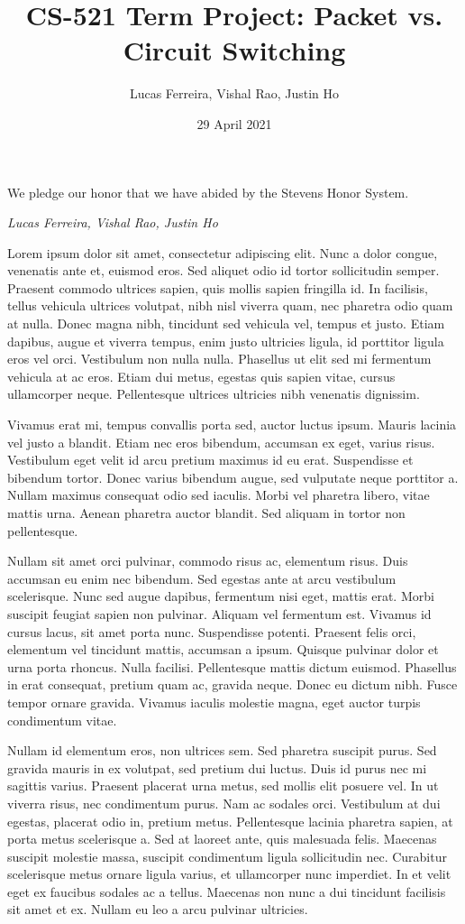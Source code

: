 \documentclass{article}
\title{CS-521 Term Project: Packet vs. Circuit Switching}
\author{Lucas Ferreira, Vishal Rao, Justin Ho}
\date{29 April 2021}
\begin{document}
  \maketitle

  {\flushleft We pledge our honor that we have abided by the Stevens Honor System.

  \textit{Lucas Ferreira, Vishal Rao, Justin Ho}}

  

Lorem ipsum dolor sit amet, consectetur adipiscing elit. Nunc a dolor congue, venenatis ante et, euismod eros. Sed aliquet odio id tortor sollicitudin semper. Praesent commodo ultrices sapien, quis mollis sapien fringilla id. In facilisis, tellus vehicula ultrices volutpat, nibh nisl viverra quam, nec pharetra odio quam at nulla. Donec magna nibh, tincidunt sed vehicula vel, tempus et justo. Etiam dapibus, augue et viverra tempus, enim justo ultricies ligula, id porttitor ligula eros vel orci. Vestibulum non nulla nulla. Phasellus ut elit sed mi fermentum vehicula at ac eros. Etiam dui metus, egestas quis sapien vitae, cursus ullamcorper neque. Pellentesque ultrices ultricies nibh venenatis dignissim.

Vivamus erat mi, tempus convallis porta sed, auctor luctus ipsum. Mauris lacinia vel justo a blandit. Etiam nec eros bibendum, accumsan ex eget, varius risus. Vestibulum eget velit id arcu pretium maximus id eu erat. Suspendisse et bibendum tortor. Donec varius bibendum augue, sed vulputate neque porttitor a. Nullam maximus consequat odio sed iaculis. Morbi vel pharetra libero, vitae mattis urna. Aenean pharetra auctor blandit. Sed aliquam in tortor non pellentesque.

Nullam sit amet orci pulvinar, commodo risus ac, elementum risus. Duis accumsan eu enim nec bibendum. Sed egestas ante at arcu vestibulum scelerisque. Nunc sed augue dapibus, fermentum nisi eget, mattis erat. Morbi suscipit feugiat sapien non pulvinar. Aliquam vel fermentum est. Vivamus id cursus lacus, sit amet porta nunc. Suspendisse potenti. Praesent felis orci, elementum vel tincidunt mattis, accumsan a ipsum. Quisque pulvinar dolor et urna porta rhoncus. Nulla facilisi. Pellentesque mattis dictum euismod. Phasellus in erat consequat, pretium quam ac, gravida neque. Donec eu dictum nibh. Fusce tempor ornare gravida. Vivamus iaculis molestie magna, eget auctor turpis condimentum vitae.

Nullam id elementum eros, non ultrices sem. Sed pharetra suscipit purus. Sed gravida mauris in ex volutpat, sed pretium dui luctus. Duis id purus nec mi sagittis varius. Praesent placerat urna metus, sed mollis elit posuere vel. In ut viverra risus, nec condimentum purus. Nam ac sodales orci. Vestibulum at dui egestas, placerat odio in, pretium metus. Pellentesque lacinia pharetra sapien, at porta metus scelerisque a. Sed at laoreet ante, quis malesuada felis. Maecenas suscipit molestie massa, suscipit condimentum ligula sollicitudin nec. Curabitur scelerisque metus ornare ligula varius, et ullamcorper nunc imperdiet. In et velit eget ex faucibus sodales ac a tellus. Maecenas non nunc a dui tincidunt facilisis sit amet et ex. Nullam eu leo a arcu pulvinar ultricies.
\end{document}
